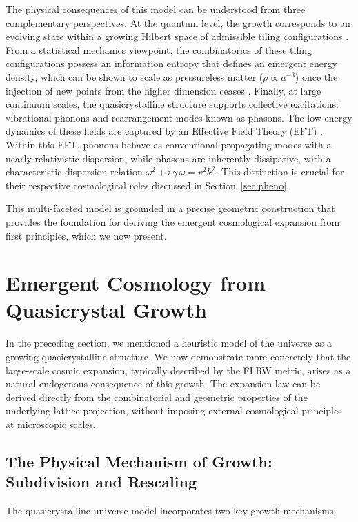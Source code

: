 \documentclass[universe,article,submit,pdftex,moreauthors]{Definitions/mdpi}
\begin{document}
The physical consequences of this model can be understood from three complementary perspectives. At the quantum level, the growth corresponds to an evolving state within a growing Hilbert space of admissible tiling configurations \cite{Connes}. From a statistical mechanics viewpoint, the combinatorics of these tiling configurations possess an information entropy that defines an emergent energy density, which can be shown to scale as pressureless matter ($\rho \propto a^{-3}$) once the injection of new points from the higher dimension ceases \cite{Amaral2024}. Finally, at large continuum scales, the quasicrystalline structure supports collective excitations: vibrational phonons and rearrangement modes known as phasons. The low-energy dynamics of these fields are captured by an Effective Field Theory (EFT) \cite{Baggioli:2020haa}. Within this EFT, phonons behave as conventional propagating modes with a nearly relativistic dispersion, while phasons are inherently dissipative, with a characteristic dispersion relation $\omega^2 + i\,\gamma\,\omega = v^2 k^2$. This distinction is crucial for their respective cosmological roles discussed in Section~\ref{sec:pheno}.

This multi-faceted model is grounded in a precise geometric construction that provides the foundation for deriving the emergent cosmological expansion from first principles, which we now present.


\section{Emergent Cosmology from Quasicrystal Growth}
\label{sec:QC-expansion}

In the preceding section, we mentioned a heuristic model of the universe as a growing quasicrystalline structure. We now demonstrate more concretely that the large-scale cosmic expansion, typically described by the FLRW metric, arises as a natural endogenous consequence of this growth. The expansion law can be derived directly from the combinatorial and geometric properties of the underlying lattice projection, without imposing external cosmological principles at microscopic scales.

\subsection{The Physical Mechanism of Growth: Subdivision and Rescaling}

The quasicrystalline universe model incorporates two key growth mechanisms:
\end{document}

